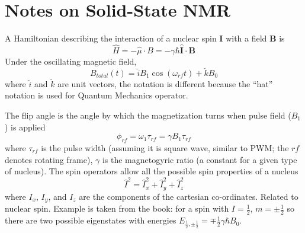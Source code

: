 \documentclass[12pt]{book}
\begin{document}
\section{Notes on Solid-State NMR}

A Hamiltonian describing the interaction of a nuclear spin $\mathbf{I}$ with a field $\mathbf{B}$ is 
\[
\hat{H}=-\hat{\mu}\cdot B=-\gamma\hbar\mathbf{\hat{I}}\cdot\mathbf{B}
\]
Under the oscillating magnetic field, 
\[
B_{total}\left(t\right)=\breve{i}B_{1}\cos\left(\omega_{rf}t\right)+\breve{k}B_{0}
\]
where $\breve{i}$ and $\breve{k}$ are unit vectors, the notation is different because the ``hat'' notation is used for Quantum Mechanics operator.

The flip angle is the angle by which the magnetization turns when pulse field ($B_{1}$) is applied \[
\phi_{rf}=\omega_{1}\tau_{rf}=\gamma B_{1}\tau_{rf}
\]
where $\tau_{rf}$ is the pulse width (assuming it is square wave, similar to PWM; the $rf$ denotes rotating frame), $\gamma$ is the magnetogyric ratio (a constant for a given type of nucleus). The spin operators allow all the possible spin properties of a nucleus 
\[
\hat{I}^{2}=\hat{I}_{x}^{2}+\hat{I}_{y}^{2}+\hat{I}_{z}^{2}
\]
where $I_{x}$, $I_{y}$, and $I_{z}$ are the components of the cartesian co-ordinates. Related to nuclear spin. Example is taken from the book: for a spin with $I=\frac{1}{2}$, $m=\pm\frac{1}{2}$ so there are
two possible eigenstates with energies $E_{\frac{1}{2},\pm\frac{1}{2}}=\mp\frac{1}{2}\gamma\hbar B_{0}$. 
\end{document}
